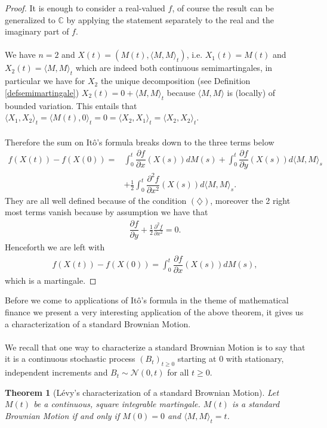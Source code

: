 \documentclass[11pt,a4paper, final]{article}
\newtheorem{thm}{Theorem}[section]
\begin{document}
\begin{proof} It is enough to consider a real-valued $f$, of course the result can be generalized to $\mathbb{C}$ by applying the statement separately to the real and the imaginary part of $f$. 
\\\\
We have $n=2$ and $X(t)=(M(t), \langle M, M \rangle_t)$, i.e. $X_1(t)=  M(t)$ and $X_2(t)= \langle M, M \rangle_t$ which are indeed both continuous semimartingales, in particular we have for $X_2$ the unique decomposition (see Definition \ref{defsemimartingale}) $X_2(t)=0 + \langle M, M \rangle_t$ because $\langle M, M \rangle$ is (locally) of bounded variation. This entails that $\langle X_1, X_2 \rangle_t = \langle M(t), 0 \rangle_t=0= \langle X_2, X_1 \rangle_t = \langle X_2, X_2 \rangle_t$.  
\\\\
Therefore the sum on Itô's formula breaks down to the three terms below
\begin{align*}
f(X(t))-f(X(0)) = &\int_0^t \dfrac{\partial f}{\partial x}(X(s))dM(s) + \int_0^t \dfrac{\partial f}{\partial y}(X(s)) d \langle M, M \rangle_s  \\
& +\frac{1}{2} \int_0^t \dfrac{\partial^2f}{\partial x^2}(X(s)) d \langle M, M \rangle_s.
\end{align*}
They are all well defined because of the condition $(\diamondsuit)$, moreover the 2 right most terms vanish because by assumption we have that 
\begin{align*}
\dfrac{\partial f}{\partial y}+ \frac{1}{2} \frac{\partial^2 f}{\partial x^2} =0.
\end{align*}
Henceforth we are left with
\begin{align*}
f(X(t))-f(X(0)) = \int_0^t \dfrac{\partial f}{\partial x} (X(s)) dM(s),
\end{align*}
which is a martingale. 
\end{proof}
\noindent Before we come to applications of Itô's formula in the theme of mathematical finance we present a very interesting application of the above theorem, it gives us a characterization of a standard Brownian Motion. 
\\\\
We recall that one way to characterize a standard Brownian Motion is to say that it is a continuous stochastic process $(B_t)_{t \geq 0}$ starting at $0$ with stationary, independent increments and $B_t \sim \mathcal{N}(0,t)$ for all $t \geq 0$. 
\newpage
\begin{thm}[Lévy's characterization of a standard Brownian Motion] Let $M(t)$ be a continuous, square integrable martingale. $M(t)$ is a standard Brownian Motion if and only if $M(0)=0$ and $\langle M,M \rangle_t = t$.
\end{thm}
\end{document}
